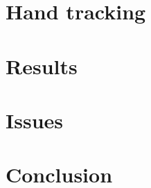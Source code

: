 \documentclass[conference]{IEEEtran}
\begin{document}
    \section{Hand tracking}\label{sec:hand_tracking}
    

    \section{Results}\label{sec:results}
    

    \section{Issues}\label{sec:issues}
    

    \section{Conclusion}\label{sec:conclusion}
    

    
\end{document}
